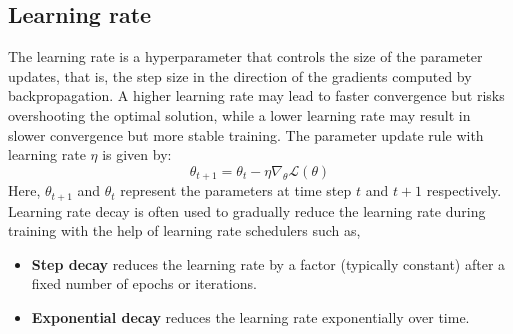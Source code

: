 \subsection{Learning rate}
The learning rate is a hyperparameter that controls the size of the parameter updates, that is, the step size in the direction of the gradients computed by backpropagation. A higher learning rate may lead to faster convergence but risks overshooting the optimal solution, while a lower learning rate may result in slower convergence but more stable training. The parameter update rule with learning rate $\eta$ is given by:
\begin{equation}
    \theta_{t+1}=\theta_t-\eta \nabla_\theta \mathcal{L}(\theta)
    \end{equation}
Here, $\theta_{t+1}$ and $\theta_t$ represent the parameters at time step $t$ and $t+1$ respectively. Learning rate decay is often used to gradually reduce the learning rate during training with the help of learning rate schedulers such as,
\begin{itemize}
\item \textbf{Step decay} reduces the learning rate by a factor (typically constant) after a fixed number of epochs or iterations.
\item \textbf{Exponential decay} reduces the learning rate exponentially over time.
\end{itemize}
